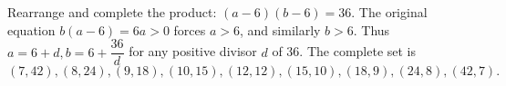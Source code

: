 Rearrange and complete the product: $(a-6)(b-6)=36 $. The original equation $ b(a-6)=6a>0 $ forces $ a>6 $, and similarly $ b>6 $. Thus $ a=6+d,b=6+\dfrac{36}{d}$ for any positive divisor $ d $ of 36. The complete set is \[\boxed{(7,42),(8,24),(9,18),(10,15),(12,12),(15,10),(18,9),(24,8),(42,7)}.\]
